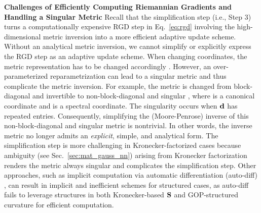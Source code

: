 %

{\bf Challenges of Efficiently Computing Riemannian Gradients
and  Handling a Singular Metric
}
Recall that the simplification step (i.e., Step 3) turns a computationally expensive RGD step in Eq.~\eqref{eq:rgd} involving the high-dimensional metric inversion into a more efficient adaptive update scheme.
Without an analytical metric inversion, we cannot simplify or explicitly express the RGD step as an adaptive update scheme.
When changing coordinates, the metric representation has to be changed accordingly \citep{lee2018introduction}.
%
However, an over-parameterized reparametrization can lead to a singular metric and thus complicate the metric inversion. 
For example, the metric is changed 
from block-diagonal and invertible   to non-block-diagonal and singular  , where \scalebox{0.8}{$\vtau=\{\vmu,\vS\}$} is a canonical coordinate and \scalebox{0.8}{$\veta=\{\vmu,\vd,\vB\}$} is a spectral coordinate.
The singularity occurs when $\mbox{$\mbox{$\mathbf{d}$}$}$ has repeated entries.
Consequently, simplifying the (Moore-Penrose) inverse of this non-block-diagonal and singular metric is nontrivial. 
In other words, 
the inverse metric no longer admits an \emph{explicit}, simple, and analytical form.
%
%
The simplification step is more challenging in Kronecker-factorized cases because ambiguity (see  Sec.~\ref{sec:mat_gauss_nn}) arising from Kronecker factorization renders the metric always singular and complicates the simplification step.
Other approaches, such as implicit computation via automatic differentiation (auto-diff) \citep{salimbeni2018natural}, can result in implicit and inefficient schemes for structured cases, 
as auto-diff fails to leverage structures in both Kronecker-based $\mbox{$\mbox{$\mathbf{S}$}$}$ and GOP-structured curvature for efficient computation.
%



%
%
%
%
